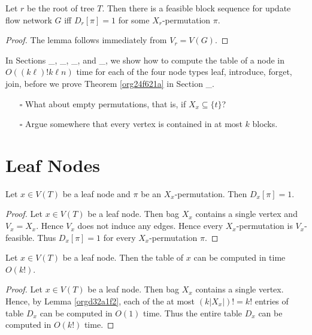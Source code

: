 \documentclass[fontsize=11pt,paper=a4]{book}
\begin{document}
\begin{lem}
Let \(r\) be the root of tree \(T\). Then there is a feasible block sequence for update flow network \(G\) iff \(D_r[\pi]=1\) for some \(X_r\)-permutation \(\pi\).
\label{org8934066}
\end{lem}

\begin{proof}
The lemma follows immediately from \(V_r=V(G)\).
\end{proof}

In Sections \_, \_, \_, and \_, we show how to compute the table of a node in \(O((k\ell)!k\ell n)\) time for each of the four node types leaf, introduce, forget, join, before we prove Theorem \ref{org24f621a} in Section \_.

\begin{itemize}
\item[{$\square$}] What about empty permutations, that is, if \(X_x\subseteq\{t\}\)?

\item[{$\square$}] Argue somewhere that every vertex is contained in at most \(k\) blocks.
\end{itemize}

\section{Leaf Nodes}
\label{sec:orgadf9869}

\begin{lem}
Let \(x\in V(T)\) be a leaf node and \(\pi\) be an \(X_x\)-permutation.
Then \(D_x[\pi]=1\).
\label{orgd32a1f2}
\end{lem}

\begin{proof}
Let \(x\in V(T)\) be a leaf node.
Then bag \(X_x\) contains a single vertex and \(V_x=X_x\).
Hence \(V_x\) does not induce any edges.
Hence every \(X_x\)-permutation is \(V_x\)-feasible.
Thus \(D_x[\pi]=1\) for every \(X_x\)-permutation \(\pi\).
\end{proof}

\begin{lem}
Let \(x\in V(T)\) be a leaf node.
Then the table of \(x\) can be computed in time \(O(k!)\).
\label{orgda685e3}
\end{lem}

\begin{proof}
Let \(x\in V(T)\) be a leaf node.
Then bag \(X_x\) contains a single vertex.
Hence, by Lemma \ref{orgd32a1f2}, each of the at most \((k\lvert X_x\rvert)!=k!\) entries of table \(D_x\) can be computed in \(O(1)\) time.
Thus the entire table \(D_x\) can be computed in \(O(k!)\) time.
\end{proof}
\end{document}
